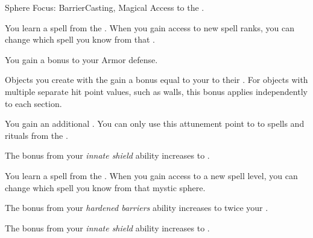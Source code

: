     \begin{feat}{Sphere Focus: Barrier}{Casting, Magical}
        \featpre Access to the  .

         You learn a spell from the  .
        When you gain access to new spell ranks, you can change which spell you know from that .

         You gain a  bonus to your Armor defense.

         Objects you create with the   gain a bonus equal to your  to their .
        For objects with multiple separate hit point values, such as walls, this bonus applies independently to each section.

         You gain an additional .
        You can only use this attunement point to  to spells and rituals from the  .

         The bonus from your \textit{innate shield} ability increases to .

         You learn a spell from the  .
        When you gain access to a new spell level, you can change which spell you know from that mystic sphere.

         The bonus from your \textit{hardened barriers} ability increases to twice your .

         The bonus from your \textit{innate shield} ability increases to .
    \end{feat}


